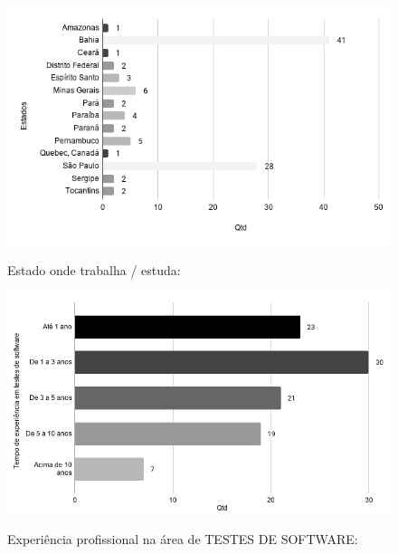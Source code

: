     
        \begin{figure}[!htb]
        \centering
        \includegraphics[width=.80\textwidth]{images/s_estado.png}
        \label{figure:s_estado}
        \caption{Estado onde trabalha / estuda:}
        \end{figure}


        \begin{figure}[!htb]
        \centering
        \includegraphics[width=.80\textwidth]{images/s_experienciatestes.png}
        \label{figure:s_experienciatestes}
        \caption{Experiência profissional na área de TESTES DE SOFTWARE:}
        \end{figure}
    

